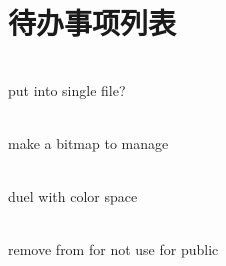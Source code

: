 \chapter{待办事项列表 }
\hypertarget{todo}{}\label{todo}

\begin{DoxyRefList}
\item[{\parbox[t]{\linewidth}{成员 \doxylink{_descriptor_heap_manager_8h_a3084768cffd316636700264f0c5428fa}{EDescriptor\+Heap\+Type} }}]\hfill \\
\label{todo__todo000002}%
%
put into single file?  
\item[{\parbox[t]{\linewidth}{成员 \doxylink{class_f_descriptor_heap_manager_a93d8c8488a7b7f0707d5004bbc91fda0}{FDescriptor\+Heap\+Manager::\+Free} (\doxylink{_descriptor_heap_manager_8h_a3084768cffd316636700264f0c5428fa}{EDescriptor\+Heap\+Type} type, \doxylink{struct_f_heap_allocator}{FHeap\+Allocator} \texorpdfstring{$\ast$}{*}\+In\+Allocator)}}]\hfill \\
\label{todo__todo000003}%
%
make a bitmap to manage  
\item[{\parbox[t]{\linewidth}{结构体 \doxylink{struct_z_engine_1_1_r_h_i_1_1_f_clear_value_binding}{ZEngine::\+RHI::\+FClear\+Value\+Binding} }}]\hfill \\
\label{todo__todo000001}%
%
duel with color space  
\item[{\parbox[t]{\linewidth}{成员 \doxylink{class_z_engine_1_1_r_h_i_1_1_f_d_x12_r_h_i_a60cf8af5d6bd0c6678421e31c4806c61}{ZEngine::\+RHI::\+FDX12\+RHI::\+Enable\+Debug} () override}}]\hfill \\
\label{todo__todo000004}%
%
remove from  for not use for public 
\end{DoxyRefList}